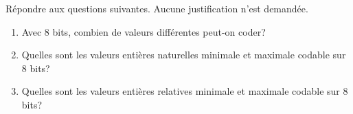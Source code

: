 \documentclass[a4paper,10pt]{report}
\def\ptsexoA{3}
\def\ptsexoB{3}
\begin{document}

\renewcommand{\labelitemi}{\textbullet} %


\pagestyle{DS_FP}          %
\NomPrenomNote{}


\exods{\ptsexoA}

Répondre aux questions suivantes. Aucune justification n'est demandée.

\begin{enumerate}
    \item Avec 8 bits, combien de valeurs différentes peut-on coder? \dotfill
    \item Quelles sont les valeurs entières naturelles minimale et maximale codable sur 8 bits? \dotfill
    \item Quelles sont les valeurs entières relatives minimale et maximale codable sur 8 bits? \dotfill
\end{enumerate}


\exods{\ptsexoB}
\end{document}
